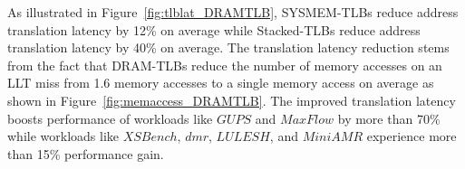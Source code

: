 As illustrated in Figure~\ref{fig:tlblat_DRAMTLB}, SYSMEM-TLBs reduce
address translation latency by 12\% on average while Stacked-TLBs
reduce address translation latency by 40\% on average. The translation
latency reduction stems from the fact that DRAM-TLBs reduce the number
of memory accesses on an LLT miss from 1.6 memory accesses to a single
memory access on average as shown in Figure~\ref{fig:memaccess_DRAMTLB}. The
improved translation latency boosts performance of workloads like
$GUPS$ and $MaxFlow$ by more than 70\% while workloads like $XSBench$,
$dmr$, $LULESH$, and $MiniAMR$ experience more than 15\% performance
gain.

